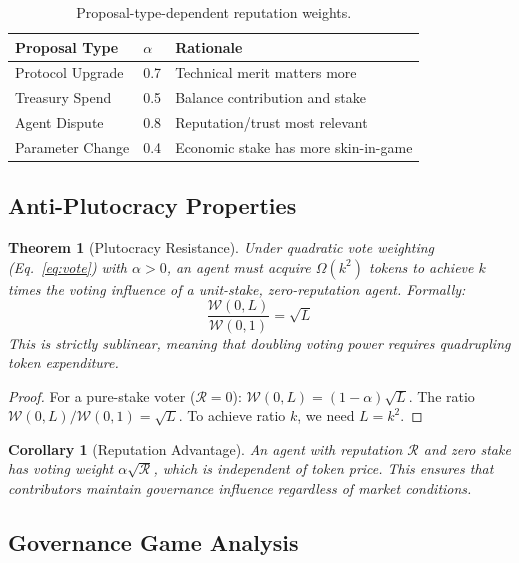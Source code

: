 \documentclass{article}
\newtheorem{theorem}{Theorem}
\newtheorem{corollary}{Corollary}
\begin{document}
\begin{table}[t]
\centering
\begin{tabular}{lll}
\toprule
\textbf{Proposal Type} & \textbf{$\alpha$} & \textbf{Rationale} \\
\midrule
Protocol Upgrade & 0.7 & Technical merit matters more \\
Treasury Spend & 0.5 & Balance contribution and stake \\
Agent Dispute & 0.8 & Reputation/trust most relevant \\
Parameter Change & 0.4 & Economic stake has more skin-in-game \\
\bottomrule
\end{tabular}
\caption{Proposal-type-dependent reputation weights.}
\label{tab:alpha}
\end{table}

\subsection{Anti-Plutocracy Properties}

\begin{theorem}[Plutocracy Resistance]\label{thm:plutocracy}
Under quadratic vote weighting (Eq.~\ref{eq:vote}) with $\alpha > 0$, an agent must acquire $\Omega(k^2)$ tokens to achieve $k$ times the voting influence of a unit-stake, zero-reputation agent. Formally:
\begin{equation}
    \frac{\mathcal{W}(0, L)}{\mathcal{W}(0, 1)} = \sqrt{L}
\end{equation}
This is strictly sublinear, meaning that doubling voting power requires quadrupling token expenditure.
\end{theorem}

\begin{proof}
For a pure-stake voter ($\mathcal{R} = 0$): $\mathcal{W}(0, L) = (1-\alpha)\sqrt{L}$. The ratio $\mathcal{W}(0,L)/\mathcal{W}(0,1) = \sqrt{L}$. To achieve ratio $k$, we need $L = k^2$.
\end{proof}

\begin{corollary}[Reputation Advantage]
An agent with reputation $\mathcal{R}$ and zero stake has voting weight $\alpha\sqrt{\mathcal{R}}$, which is independent of token price. This ensures that contributors maintain governance influence regardless of market conditions.
\end{corollary}

\subsection{Governance Game Analysis}
\end{document}
